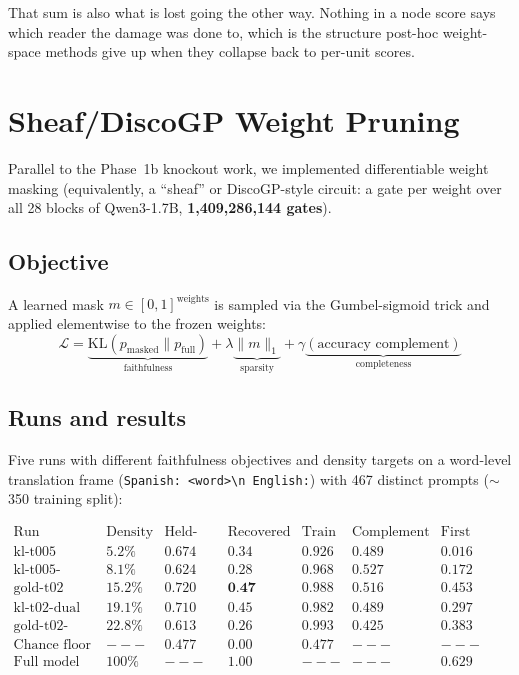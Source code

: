 \documentclass[11pt,a4paper]{article}
\begin{document}
That sum is also what is lost going the other way. Nothing in a node score says which
reader the damage was done to, which is the structure post-hoc weight-space methods give
up when they collapse back to per-unit scores.

\section{Sheaf/DiscoGP Weight Pruning}\label{sec:sheaf}

Parallel to the Phase~1b knockout work, we implemented differentiable weight masking
(equivalently, a ``sheaf'' or DiscoGP-style circuit: a gate per weight over all 28 blocks
of Qwen3-1.7B, \textbf{1,409,286,144 gates}).

\subsection{Objective}

A learned mask \(m \in [0,1]^\text{weights}\) is sampled via the Gumbel-sigmoid trick and
applied elementwise to the frozen weights:
\[
\mathcal{L} = \underbrace{\text{KL}(p_\text{masked} \parallel p_\text{full})}_{\text{faithfulness}}
+ \lambda \underbrace{\|m\|_1}_\text{sparsity}
+ \gamma \underbrace{(\text{accuracy complement})}_\text{completeness}
\]

\subsection{Runs and results}

Five runs with different faithfulness objectives and density targets on a word-level
translation frame (\texttt{Spanish: \textless word\textgreater \textbackslash n English:})
with 467 distinct prompts ($\sim$350 training split):

\[
\begin{array}{lcccccc}
\text{Run} & \text{Density} & \text{Held-out} & \text{Recovered} & \text{Train} & \text{Complement} & \text{First token} \\ \hline
\text{kl-t005} & 5.2\% & 0.674 & 0.34 & 0.926 & 0.489 & 0.016 \\
\text{kl-t005-frame} & 8.1\% & 0.624 & 0.28 & 0.968 & 0.527 & 0.172 \\
\text{gold-t02} & 15.2\% & 0.720 & \textbf{0.47} & 0.988 & 0.516 & 0.453 \\
\text{kl-t02-dual} & 19.1\% & 0.710 & 0.45 & 0.982 & 0.489 & 0.297 \\
\text{gold-t02-units} & 22.8\% & 0.613 & 0.26 & 0.993 & 0.425 & 0.383 \\ \hline
\text{Chance floor} & --- & 0.477 & 0.00 & 0.477 & --- & --- \\
\text{Full model} & 100\% & --- & 1.00 & --- & --- & 0.629 \\
\end{array}
\]
\end{document}
